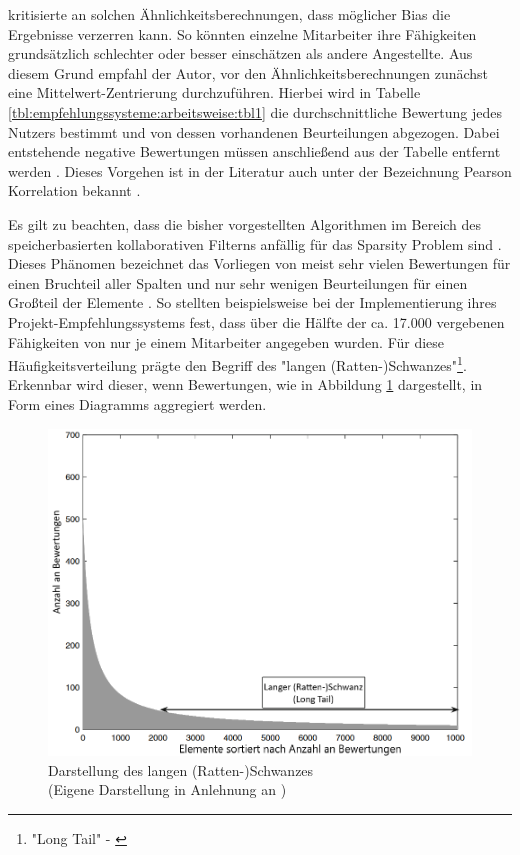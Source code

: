 \textcite[S. 35ff.]{recommenderSystems:2016} kritisierte an solchen Ähnlichkeitsberechnungen, dass möglicher Bias die Ergebnisse verzerren kann. So könnten einzelne Mitarbeiter ihre Fähigkeiten grundsätzlich schlechter oder besser einschätzen als andere Angestellte. Aus diesem Grund empfahl der Autor, vor den Ähnlichkeitsberechnungen zunächst eine Mittelwert-Zentrierung durchzuführen. Hierbei wird in Tabelle \ref{tbl:empfehlungssysteme:arbeitsweise:tbl1} die durchschnittliche Bewertung jedes Nutzers bestimmt und von dessen vorhandenen Beurteilungen abgezogen. Dabei entstehende negative Bewertungen müssen anschließend aus der Tabelle entfernt werden \cite[S. 35ff.]{recommenderSystems:2016}. Dieses Vorgehen ist in der Literatur auch unter der Bezeichnung Pearson Korrelation bekannt \cite[S. 3]{bharti:2019}.

Es gilt zu beachten, dass die bisher vorgestellten Algorithmen im Bereich des speicherbasierten kollaborativen Filterns anfällig für das Sparsity Problem sind \cite[S. 3f.]{grvcar:2006}. Dieses Phänomen bezeichnet das Vorliegen von meist sehr vielen Bewertungen für einen Bruchteil aller Spalten und nur sehr wenigen Beurteilungen für einen Großteil der Elemente \cite[S. 8]{recommenderSystems:2016}. So stellten beispielsweise \textcite[S. 3]{mitre:2014} bei der Implementierung ihres Projekt-Empfehlungssystems fest, dass über die Hälfte der ca. 17.000 vergebenen Fähigkeiten von nur je einem Mitarbeiter angegeben wurden.
Für diese Häufigkeitsverteilung prägte \textcite[S. 11, Z. 32]{anderson:2007} den Begriff des "langen (Ratten-)Schwanzes"\footnote{"Long Tail" - \textcite[S. 11, Z. 32]{anderson:2007}}. Erkennbar wird dieser, wenn Bewertungen, wie in Abbildung \ref{fig:empfehlungssysteme:cf:speicherbasiert:abb1} dargestellt, in Form eines Diagramms aggregiert werden.

\begin{figure}[h]
	\centering
	\includegraphics[width=1\textwidth]{gfx/long-tail.png}
	\caption[Darstellung des langen (Ratten-)Schwanzes]{Darstellung des langen (Ratten-)Schwanzes\\
		(Eigene Darstellung in Anlehnung an \cite[S. 33]{recommenderSystems:2016})}
	\label{fig:empfehlungssysteme:cf:speicherbasiert:abb1}
\end{figure}


